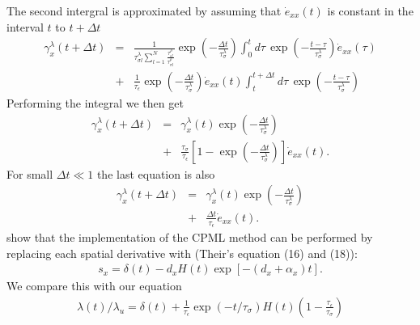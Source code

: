 \documentclass[11pt]{article}
\begin{document}
The second intergral is approximated by
 assuming that $\dot{e}_{xx}(t)$ is constant in the interval $t$ to $t+\Delta t$
\begin{eqnarray*}
\gamma^{\lambda}_x(t+\Delta t) 
 & = & %
  \frac{1}{\tau^{\lambda}_{\sigma l}\sum_{l=1}^N \frac{\tau^{\rho}_{\epsilon l}}{\tau^{\rho}_{\sigma l}}}
\exp(-\frac{\Delta t}{\tau^{\lambda}_{\sigma}})
       \int^{t}_0 d\tau\,
       \exp(-\frac{t-\tau}{\tau^{\lambda}_{\sigma}})
       \dot{e}_{xx}(\tau)\\
 & + &
       \frac{1}{\tau_{\epsilon}} \exp(-\frac{\Delta t}{\tau^{\lambda}_{\sigma}})
       \dot{e}_{xx}(t)\int^{t+\Delta t}_t d\tau\,
       \exp(-\frac{t-\tau}{\tau^{\lambda}_{\sigma}})
\end{eqnarray*}
Performing the integral we then get
\begin{eqnarray*}
\gamma^{\lambda}_x(t+\Delta t) 
   & = & \gamma^{\lambda}_x (t)\exp(-\frac{\Delta t}{\tau^{\lambda}_{\sigma}}) \\
   & + & \frac{\tau_{\sigma}}{\tau_{\epsilon}}
         \left[1-\exp(-\frac{\Delta t}{\tau^{\lambda}_{\sigma}})\right]
         \dot{e}_{xx}(t).
\end{eqnarray*}
%
For small $\Delta t \ll 1$ the last equation is also
\begin{eqnarray*}
\gamma^{\lambda}_x(t+\Delta t) 
   & = & \gamma^{\lambda}_x (t)\exp(-\frac{\Delta t}{\tau^{\lambda}_{\sigma}}) \\
   & + & \frac{\Delta t}{\tau_{\epsilon}}\dot{e}_{xx}(t).
\end{eqnarray*}
\cite{Komatitsch2007} show that the implementation of the CPML method can
be performed by replacing each spatial derivative with
(Their's equation (16) and (18)):
\begin{eqnarray}
  s_x = \delta(t) - d_x H(t) \exp \left[-(d_x+\alpha_x)t\right].
                                          \label{eq:A-Komatitsch} 
\end{eqnarray}
We compare this with our equation
\begin{eqnarray}
  \lambda(t)/\lambda_u = \delta(t) + \frac{1}{\tau_{\epsilon}}
                         \exp(-t/\tau_{\sigma}) H(t)
                         \left(1-\frac{\tau_{\epsilon}}{\tau_{\sigma}}\right)
                                           \label{eq:A-lambda}
\end{eqnarray}
\end{document}
